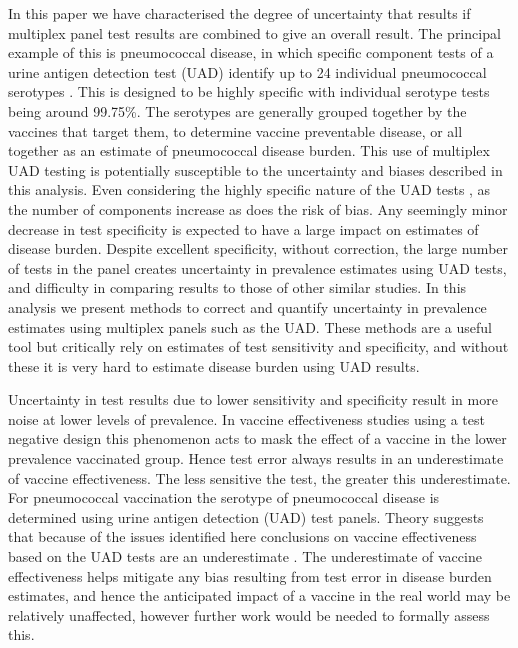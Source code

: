 \documentclass[10pt,letterpaper]{article}
\begin{document}
In this paper we have characterised the degree of uncertainty that results if multiplex panel test results are combined to give an overall result. The principal example of this is pneumococcal disease, in which specific component tests of a urine antigen detection test (UAD) identify up to 24 individual pneumococcal serotypes \cite{pride2012,bonten2015}. This is designed to be highly specific with individual serotype tests being around 99.75\%. The serotypes are generally grouped together by the vaccines that target them, to determine vaccine preventable disease, or all together as an estimate of pneumococcal disease burden. This use of multiplex UAD testing is potentially susceptible to the uncertainty and biases described in this analysis. Even considering the highly specific nature of the UAD tests \cite{pride2012}, as the number of components increase as does the risk of bias. Any seemingly minor decrease in test specificity is expected to have a large impact on estimates of disease burden. Despite excellent specificity, without correction, the large number of tests in the panel creates uncertainty in prevalence estimates using UAD tests, and difficulty in comparing results to those of other similar studies. In this analysis we present methods to correct and quantify uncertainty in prevalence estimates using multiplex panels such as the UAD. These methods are a useful tool but critically rely on estimates of test sensitivity and specificity, and without these it is very hard to estimate disease burden using UAD results.

Uncertainty in test results due to lower sensitivity and specificity result in more noise at lower levels of prevalence\cite{haile2022,endo2020}. In vaccine effectiveness studies using a test negative design this phenomenon acts to mask the effect of a vaccine in the lower prevalence vaccinated group. Hence test error always results in an underestimate of vaccine effectiveness\cite{endo2020}. The less sensitive the test, the greater this underestimate. For pneumococcal vaccination the serotype of pneumococcal disease is determined using urine antigen detection (UAD) test panels\cite{pride2012,bonten2015}. Theory suggests that because of the issues identified here conclusions on vaccine effectiveness based on the UAD tests are an underestimate \cite{endo2020}. The underestimate of vaccine effectiveness helps mitigate any bias resulting from test error in disease burden estimates, and hence the anticipated impact of a vaccine in the real world may be relatively unaffected, however further work would be needed to formally assess this.
\end{document}
